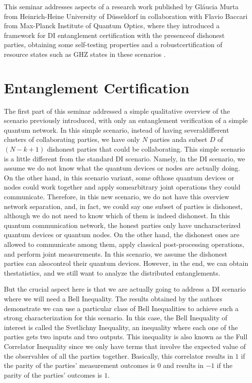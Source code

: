 \documentclass[12pt]{article}
\begin{document}
    This seminar addresses aspects of a research work published by Gl\'{a}ucia Murta from Heinrich-Heine University of D\"{u}sseldorf in collaboration with Flavio Baccari from Max-Planck Institute of Quantum Optics, where they introduced a framework for DI entanglement certification with the presence\break of dishonest parties, obtaining some self-testing properties and a robust\break certification of resource states such as GHZ states in these scenarios \cite{murta-baccari:self-testing-dishonest-parties-dishonest-parties-device-independent-entanglement-certification-quantum-communication-networks:2023:02-2024}.
    
    \section{Entanglement Certification}
    \label{sec:entanglement-certification}

    The first part of this seminar addressed a simple qualitative overview of the scenario previously introduced, with only an entanglement verification of a simple quantum network. In this simple scenario, instead of having several\break different clusters of collaborating parties, we have only $N$ parties and\break a subset $D$ of $(N - k + 1)$ dishonest parties that could be collaborating. This simple scenario is a little different from the standard DI scenario. Namely, in the DI scenario, we assume we do not know what the quantum devices or nodes are actually doing. On the other hand, in this scenario variant, some of\break those quantum devices or nodes could work together and apply some\break arbitrary joint operations they could communicate. Therefore, in this new scenario, we do not have this overview network separation, and, in fact, we could say one subset of parties is dishonest, although we do not need to know which of them is indeed dishonest. In this quantum communication network, the honest parties only have uncharacterized quantum devices or quantum nodes. On the other hand, the dishonest ones are allowed to communicate among them, apply classical post-processing operations, and perform joint measurements. In this scenario, we assume the dishonest parties can also\break control their quantum devices. However, in the end, we can obtain the\break statistics, and we still want to analyze the distributed entanglements.

    But the crucial aspect here is that we are actually going to address a DI scenario where we will need a Bell Inequality. The results obtained by the authors demonstrate we can use a particular class of Bell Inequalities to achieve such a strong characterization for this scenario. In this case, the Bell Inequality of interest is called the Svetlichny Inequality, an inequality where each one of the parties gets two inputs and two outputs. This inequality is also known as the Full Correlator Inequality since we only have terms that involve the expected value of the observables of all the parties together. Basically, this correlator results in $1$ if the parity of the parties' measurement outcomes is $0$ and results in $-1$ if the parity of the parties' outcomes is $1$.
\end{document}

